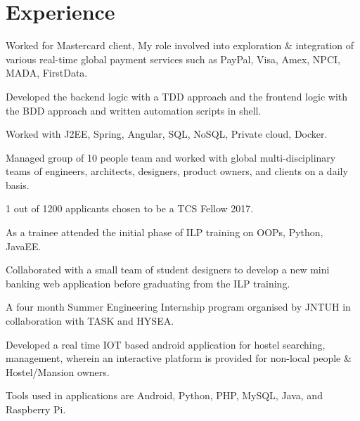 \documentclass[]{kk-resume-openfont}
\begin{document}
\hfill
\begin{minipage}[t]{0.66\textwidth} 


\section{Experience}
\vspace{\topsep} %
\begin{tightemize}
\item Worked for Mastercard client, My role involved into exploration \& integration of various real-time global payment services such as PayPal, Visa, Amex, NPCI, MADA, FirstData.
\item Developed the backend logic with a TDD approach and the frontend logic with the BDD approach and written automation scripts in shell.
\item Worked with J2EE, Spring, Angular, SQL, NoSQL, Private cloud, Docker.
\item Managed group of 10 people team and worked with global multi-disciplinary teams of engineers, architects, designers, product owners, and clients on a daily basis.
\end{tightemize}
\sectionsep

\begin{tightemize}
\item 1 out of 1200 applicants chosen to be a TCS Fellow 2017.
\item As a trainee attended the initial phase of ILP training on OOPs, Python, JavaEE.
\item Collaborated with a small team of student designers to develop a new mini banking web application before graduating from the ILP training.
\end{tightemize}
\sectionsep

\begin{tightemize}
\item A four month Summer Engineering Internship program organised by JNTUH in collaboration with TASK and HYSEA.
\item Developed a real time IOT based android application for hostel searching, management, wherein an interactive platform is provided for non-local people \& Hostel/Mansion owners.
\item Tools used in applications are Android, Python, PHP, MySQL, Java, and Raspberry Pi.
\end{tightemize}


\end{minipage}
\end{document}
